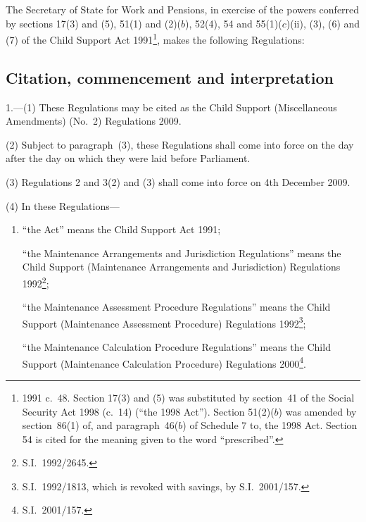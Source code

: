 \documentclass[12pt,a4paper]{article}
\title{\regstitle}
\author{S.I.\ 2009 No.\ 2909}
\date{Made
2nd November 2009\\
Laid before Parliament
9th November 2009\\
Coming into~force\\
for the purpose of regulations 1, 3(1) and (4), 4 and 5\\
10th November 2009\\
for the purpose of regulations 2 and 3(2) and (3)\\
4th December 2009
}
\begin{document}
\maketitle

\noindent
The Secretary of State for Work and Pensions, in exercise of the powers conferred by sections 17(3) and (5), 51(1) and (2)($b$), 52(4), 54 and 55(1)($c$)(ii), (3), (6) and (7) of the Child Support Act 1991\footnote{1991 c.~48. Section 17(3) and (5) was substituted by section~41 of the Social Security Act 1998 (c.~14) (“the 1998 Act”). Section 51(2)($b$)  was amended by section~86(1) of, and paragraph~46($b$)  of Schedule 7 to, the 1998 Act. Section 54 is cited for the meaning given to the word “prescribed”.}, makes the following Regulations: 

{\sloppy

\tableofcontents

}

\bigskip

\setcounter{secnumdepth}{-2}

\subsection[1. Citation, commencement and interpretation]{Citation, commencement and interpretation}

1.---(1)  These Regulations may be cited as the Child Support (Miscellaneous Amendments) (No.~2) Regulations 2009.

(2) Subject to paragraph~(3), these Regulations shall come into force on the day after the day on which they were laid before Parliament.

(3) Regulations 2 and 3(2) and (3) shall come into force on 4th December 2009.

(4) In these Regulations—
\begin{enumerate}\item[]
“the Act” means the Child Support Act 1991;

“the Maintenance Arrangements and Jurisdiction Regulations” means the Child Support (Maintenance Arrangements and Jurisdiction) Regulations 1992\footnote{S.I.~1992/2645.};

“the Maintenance Assessment Procedure Regulations” means the Child Support (Maintenance Assessment Procedure) Regulations 1992\footnote{S.I.~1992/1813, which is revoked with savings, by S.I.~2001/157.};

“the Maintenance Calculation Procedure Regulations” means the Child Support (Maintenance Calculation Procedure) Regulations 2000\footnote{S.I.~2001/157.}.
\end{enumerate}
\end{document}
